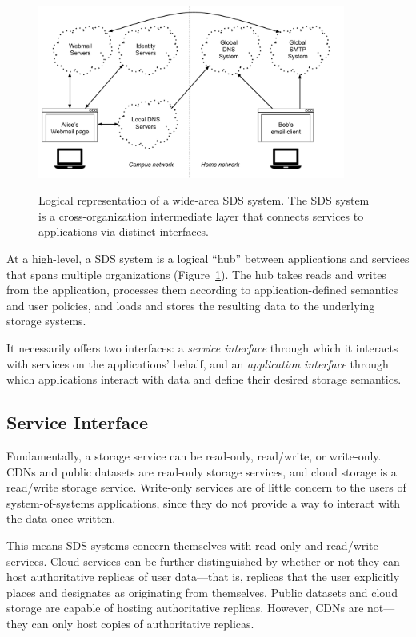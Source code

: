 \begin{figure}[h]
   \caption{Logical representation of a wide-area SDS system.  The SDS system
   is a cross-organization intermediate layer that connects services to
   applications via distinct interfaces.}
   \centering
   \includegraphics[width=0.9\textwidth,page=2]{figures/dissertation-figures}
   \label{fig:chap2-sds-overview}
\end{figure}

At a high-level, a SDS system is a logical ``hub'' between applications and
services that spans multiple organizations (Figure~\ref{fig:chap2-sds-overview}). 
The hub takes reads and writes from the application, processes them
according to application-defined semantics and user policies, and loads and stores the resulting
data to the underlying storage systems.

It necessarily offers two interfaces:  a \emph{service interface} through which it interacts with
services on the applications' behalf, and an \emph{application interface} through
which applications interact with data and define their desired storage
semantics.

\subsection{Service Interface}

Fundamentally, a storage service can be read-only, read/write, or write-only.
CDNs and public datasets are read-only storage services, and cloud storage is a
read/write storage service.  Write-only services are of little concern to the
users of system-of-systems applications, since they do not provide a way to
interact with the data once written.

This means SDS systems concern themselves with read-only and read/write
services.  Cloud services can be further distinguished by whether
or not they can host authoritative replicas of user data---that is, replicas
that the user explicitly places and designates as originating from themselves.
Public datasets and cloud storage are capable of hosting authoritative
replicas.  However, CDNs are not---they can only host copies of authoritative
replicas.

